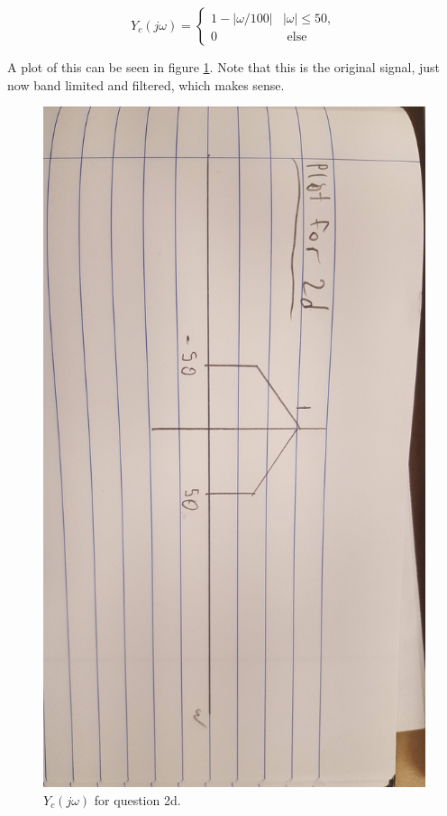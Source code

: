 \documentclass[letterpaper, reqno,11pt]{article}
\begin{document}
\[
    Y_c(j\omega)=\begin{cases}1-|\omega/100|&|\omega|\leq 50,\\0&\text{ else}\end{cases}
\]

A plot of this can be seen in figure \ref{fig:2d}. Note that this is the original signal, just now band limited and filtered, which makes sense. 

\begin{figure}[htbp]
\centering
\includegraphics[width=\textwidth]{2d}
\caption{$Y_c(j\omega)$ for question 2d. }
\label{fig:2d}
\end{figure}
\end{document}
